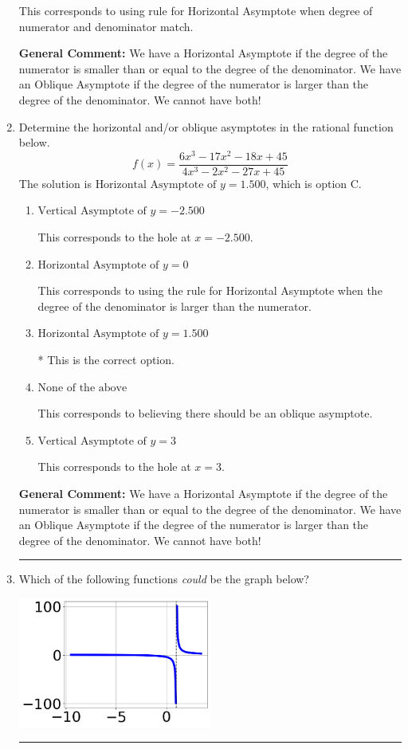 \documentclass{extbook}[14pt]
\newcommand{\litem}[1]{\item #1

\rule{\textwidth}{0.4pt}}
\begin{document}
\begin{enumerate}
{\begin{enumerate}[label=\Alph*.]
This corresponds to using rule for Horizontal Asymptote when degree of numerator and denominator match.
\end{enumerate}

\textbf{General Comment:} We have a Horizontal Asymptote if the degree of the numerator is smaller than or equal to the degree of the denominator. We have an Oblique Asymptote if the degree of the numerator is larger than the degree of the denominator. We cannot have both!
}
\litem{
Determine the horizontal and/or oblique asymptotes in the rational function below.
\[ f(x) = \frac{6x^{3} -17 x^{2} -18 x + 45}{4x^{3} -2 x^{2} -27 x + 45} \]The solution is \( \text{Horizontal Asymptote of } y = 1.500  \), which is option C.\begin{enumerate}[label=\Alph*.]
\item \( \text{Vertical Asymptote of } y = -2.500  \)

This corresponds to the hole at $x = -2.500$.
\item \( \text{Horizontal Asymptote of } y = 0  \)

This corresponds to using the rule for Horizontal Asymptote when the degree of the denominator is larger than the numerator.
\item \( \text{Horizontal Asymptote of } y = 1.500  \)

* This is the correct option.
\item \( \text{None of the above} \)

This corresponds to believing there should be an oblique asymptote.
\item \( \text{Vertical Asymptote of } y = 3  \)

This corresponds to the hole at $x = 3$.
\end{enumerate}

\textbf{General Comment:} We have a Horizontal Asymptote if the degree of the numerator is smaller than or equal to the degree of the denominator. We have an Oblique Asymptote if the degree of the numerator is larger than the degree of the denominator. We cannot have both!
}
\litem{
Which of the following functions \textit{could} be the graph below?

\begin{center}
    \includegraphics[width=0.5\textwidth]{../Figures/identifyGraphOfRationalFunctionB.png}
\end{center}


}
\end{enumerate}
\end{document}
